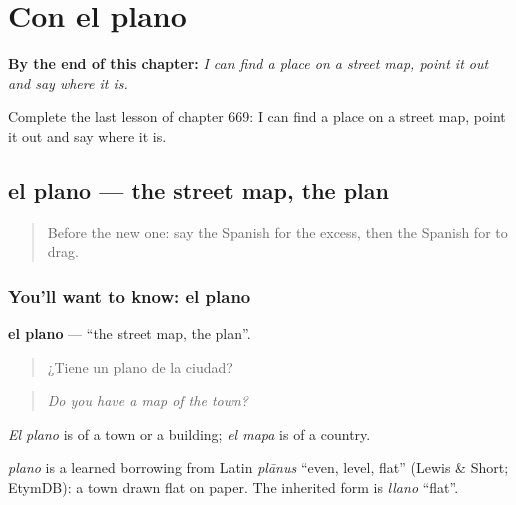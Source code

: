 
\chapter{Con el plano}
\label{ch:es-con-el-plano}

\begin{chapteropening}
\textbf{By the end of this chapter:} \emph{I can find a place on a street map, point it out and say where it is.}

Complete the last lesson of chapter 669: I can find a place on a street map, point it out and say where it is.
\end{chapteropening}

\section[el plano]{el plano — the street map, the plan}

\label{lesson:ES-C669-plano}



\begin{quote}
Before the new one: say the Spanish for the excess, then the Spanish for to drag.
\end{quote}

\subsection*{You'll want to know: el plano}
\textbf{el plano} — \textquotedblleft{}the street map, the plan\textquotedblright{}.

\begin{quote}
¿Tiene un plano de la ciudad?
\end{quote}

\begin{quote}
\emph{Do you have a map of the town?}
\end{quote}

\emph{El plano} is of a town or a building; \emph{el mapa} is of a country.

\begin{cousinweb}
\emph{plano} is a learned borrowing from Latin \emph{plānus} \textquotedblleft{}even, level, flat\textquotedblright{} (Lewis \& Short; EtymDB): a town drawn flat on paper. The inherited form is \emph{llano} \textquotedblleft{}flat\textquotedblright{}.
\end{cousinweb}

